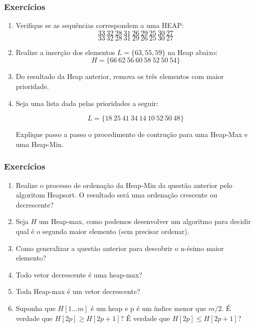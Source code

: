 \documentclass[10pt]{beamer}
\begin{document}
\begin{frame}
    \frametitle{Exercícios}
    
    \begin{enumerate}
        \item Verifique se as sequências correspondem a uma HEAP:
        $$33\ 32\ 28\ 31\ 26\ 29\ 25\ 30\ 27$$
        $$33\ 32\ 28\ 31\ 29\ 26\ 25\ 30\ 27$$
        
        \item Realize a inserção dos elementos $L = \{63, 55, 59\}$ na Heap abaixo:
        $$H = \{66\ 62\ 56\ 60\ 58\ 52\ 50\ 54\}$$
        \item Do resultado da Heap anterior, remova os três elementos com maior prioridade.
        \item Seja uma lista dada pelas prioridades a seguir:
        
        $$ L=\{18\ 25\ 41\ 34\ 14\ 10\ 52\ 50\ 48\}$$

        Explique passo a passo o procedimento de contrução para uma Heap-Max e uma Heap-Min.

        
        
        
        
    \end{enumerate}
    
\end{frame}

\begin{frame}
    \frametitle{Exercícios}
    \begin{enumerate}\addtocounter{enumi}{4}\setlength{\itemsep}{1em}
        \item Realize o processo de ordenação da Heap-Min da questão anterior pelo algoritom Heapsort. O resultado será uma ordenação crescente ou decrescente?
        \item Seja $H$ um Heap-max, como podemos desenvolver um algoritmo para decidir qual é o segundo maior elemento (sem precisar ordenar).
        \item Como generalizar a questão anterior para descobrir o n-ésimo maior elemento?
        \item Todo vetor decrescente é uma heap-max?
        \item Toda Heap-max é um vetor decrescente?
        \item  Suponha que $H[1\ldots m]$ é um heap e p é um índice menor que $m/2$.  É verdade que $H[2p] \geq H[2p+1]$?  É verdade que $H[2p] \leq H[2p+1]$?  
    \end{enumerate}
\end{frame}
\end{document}
